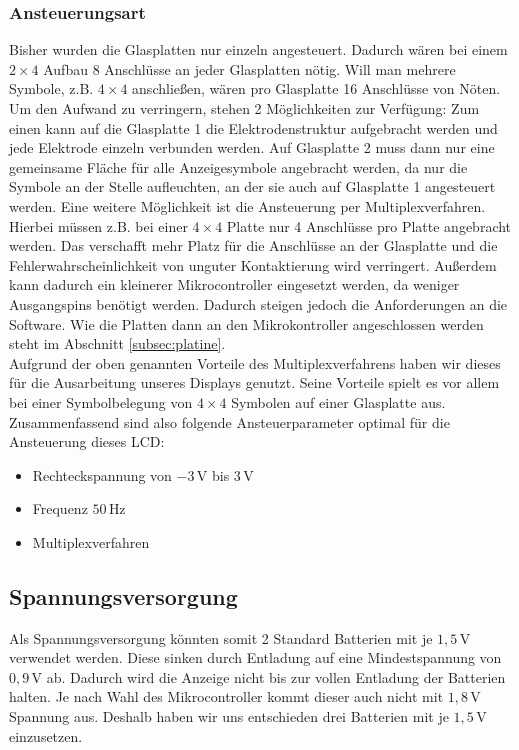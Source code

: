 \subsubsection{Ansteuerungsart}
Bisher wurden die Glasplatten nur einzeln angesteuert. Dadurch wären bei einem \(2\times4\) Aufbau 8 Anschlüsse an jeder Glasplatten nötig. Will man mehrere Symbole, z.B. \(4\times4\) anschließen, wären pro Glasplatte 16 Anschlüsse von Nöten. Um den Aufwand zu verringern, stehen 2 Möglichkeiten zur Verfügung: Zum einen kann auf die Glasplatte 1 die Elektrodenstruktur aufgebracht werden und jede Elektrode einzeln verbunden werden. Auf Glasplatte 2 muss dann nur eine gemeinsame Fläche für alle Anzeigesymbole angebracht werden, da nur die Symbole an der Stelle aufleuchten, an der sie auch auf Glasplatte 1 angesteuert werden. Eine weitere Möglichkeit ist die Ansteuerung per Multiplexverfahren. Hierbei müssen z.B. bei einer \(4\times4\) Platte nur 4 Anschlüsse pro Platte angebracht werden. Das verschafft mehr Platz für die Anschlüsse an der Glasplatte und die Fehlerwahrscheinlichkeit von unguter Kontaktierung wird verringert. Außerdem kann dadurch ein kleinerer Mikrocontroller eingesetzt werden, da weniger Ausgangspins benötigt werden. Dadurch steigen jedoch die Anforderungen an die Software. Wie die Platten dann an den Mikrokontroller angeschlossen werden steht im Abschnitt \ref{subsec:platine}.\\

Aufgrund der oben genannten Vorteile des Multiplexverfahrens haben wir dieses für die Ausarbeitung unseres Displays genutzt. Seine Vorteile spielt es vor allem bei einer Symbolbelegung von \(4\times4\) Symbolen auf einer Glasplatte aus.\\

Zusammenfassend sind also folgende Ansteuerparameter optimal für die Ansteuerung dieses LCD:
\begin{itemize}
\item Rechteckspannung von \(-3\,\textrm{V}\) bis \(3\,\textrm{V}\)
\item Frequenz \(50\,\textrm{Hz}\)
\item Multiplexverfahren
\end{itemize}

\subsection{Spannungsversorgung}
Als Spannungsversorgung könnten somit 2 Standard Batterien mit je \(1,5\,\textrm{V}\) verwendet werden. Diese sinken durch Entladung auf eine Mindestspannung von \(0,9\,\textrm{V}\) ab. Dadurch wird die Anzeige nicht bis zur vollen Entladung der Batterien halten. Je nach Wahl des Mikrocontroller kommt dieser auch nicht mit \(1,8\,\textrm{V}\) Spannung aus. Deshalb haben wir uns entschieden drei Batterien mit je \(1,5\,\textrm{V}\) einzusetzen.

